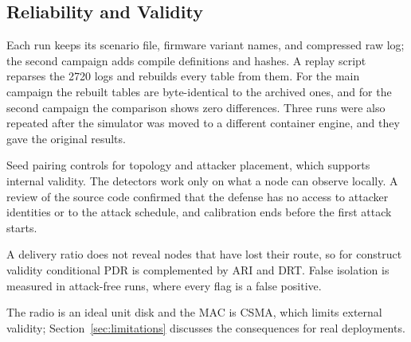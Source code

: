 \subsection{Reliability and Validity}
Each run keeps its scenario file, firmware variant names, and compressed raw log; the second campaign adds compile definitions and hashes. A replay script reparses the 2720 logs and rebuilds every table from them. For the main campaign the rebuilt tables are byte-identical to the archived ones, and for the second campaign the comparison shows zero differences. Three runs were also repeated after the simulator was moved to a different container engine, and they gave the original results.

Seed pairing controls for topology and attacker placement, which supports internal validity. The detectors work only on what a node can observe locally. A review of the source code confirmed that the defense has no access to attacker identities or to the attack schedule, and calibration ends before the first attack starts.

A delivery ratio does not reveal nodes that have lost their route, so for construct validity conditional PDR is complemented by ARI and DRT. False isolation is measured in attack-free runs, where every flag is a false positive.

The radio is an ideal unit disk and the MAC is CSMA, which limits external validity; Section~\ref{sec:limitations} discusses the consequences for real deployments.
